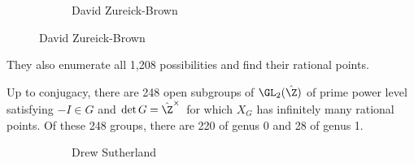 \begin{frame}[plain]
\begin{figure}[h]
\begin{subfigure}{0.3\textwidth}
	\caption{David Zureick-Brown}
	\end{subfigure}
	\end{figure}
\begin{rem}
They also enumerate all 1,208 possibilities and find their rational points. 
\end{rem}
\end{frame}


\begin{frame}[plain]
\begin{thm}
Up to conjugacy, there are 248 open subgroups of $\GL_2(\hat{\Z})$ of prime power level satisfying $-I \in G$ and $\det G= \hat{\Z}^\times$ for which $X_G$ has infinitely many rational points. Of these 248 groups, there are 220 of genus 0 and 28 of genus 1. 
\end{thm}
	\begin{figure}[h]
	\centering
	\begin{subfigure}{0.3\textwidth}
	\captionsetup{labelformat=empty}
	\centering
	\caption{Drew Sutherland}
	\end{subfigure}
	\begin{subfigure}{0.3\textwidth}
	\captionsetup{labelformat=empty}
	\centering

\end{subfigure}
\end{figure}
\end{frame}
